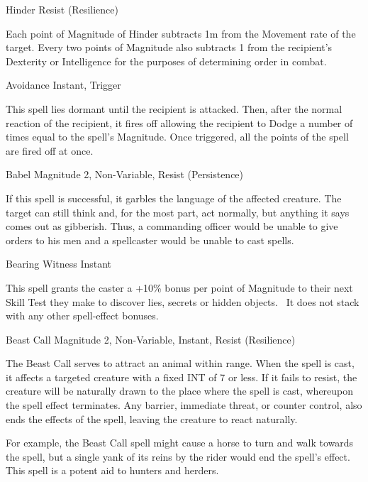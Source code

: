 \begin{samepage}
\begin{rpg-spell}
{Hinder}
{Resist (Resilience)}

Each point of Magnitude of Hinder subtracts 1m from the Movement rate of the target. Every two points of Magnitude also subtracts 1 from the recipient’s Dexterity or Intelligence for the purposes of determining order in combat. 
\end{rpg-spell}
\end{samepage}



\iffalse
\begin{rpg-spell}
{Avoidance}
{Instant, Trigger}

This spell lies dormant until the recipient is attacked. Then, after the normal reaction of the recipient, it fires off allowing the recipient to Dodge a number of times equal to the spell’s Magnitude. Once triggered, all the points of the spell are fired off at once.
\end{rpg-spell}


\begin{rpg-spell}
{Babel}
{Magnitude 2, Non-Variable, Resist (Persistence)}

If this spell is successful, it garbles the language of the affected creature. The target can still think and, for the most part, act normally, but anything it says comes out as gibberish. Thus, a commanding officer would be unable to give orders to his men and a spellcaster would be unable to cast spells.
\end{rpg-spell}


\begin{rpg-spell}
{Bearing Witness}
{Instant}

This spell grants the caster a +10\% bonus per point of Magnitude to their next Skill Test they make to discover lies, secrets or hidden objects.  It does not stack with any other spell-effect bonuses.
\end{rpg-spell}


\begin{rpg-spell}
{Beast Call}
{Magnitude 2, Non-Variable, Instant, Resist (Resilience)}

The Beast Call serves to attract an animal within range. When the spell is cast, it affects a targeted creature with a fixed INT of 7 or less. If it fails to resist, the creature will be naturally drawn to the place where the spell is cast, whereupon the spell effect terminates. Any barrier, immediate threat, or counter control, also ends the effects of the spell, leaving the creature to react naturally. 

For example, the Beast Call spell might cause a horse to turn and walk towards the spell, but a single yank of its reins by the rider would end the spell’s effect. This spell is a potent aid to hunters and herders.
\end{rpg-spell}


